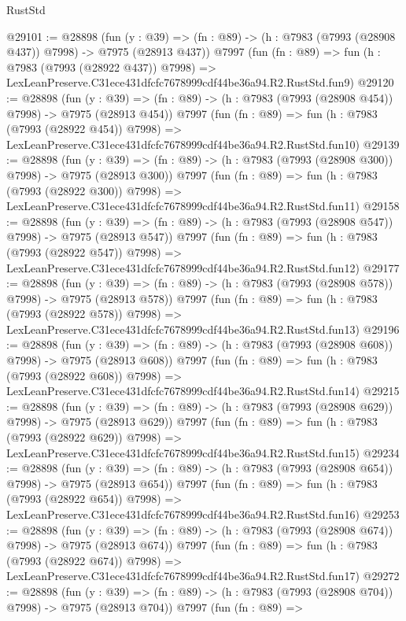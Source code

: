 \begin{lexlean}{RustStd}
\begin{coremodule}
@29101 := @28898
    (fun (y : @39) => (fn : @89) -> (h : @7983 (@7993 (@28908 @437)) @7998) -> @7975 (@28913 @437))
    @7997
    (fun (fn : @89) =>
    fun (h : @7983 (@7993 (@28922 @437)) @7998) =>
    LexLeanPreserve.C31ece431dfcfc7678999cdf44be36a94.R2.RustStd.fun9)
@29120 := @28898
    (fun (y : @39) => (fn : @89) -> (h : @7983 (@7993 (@28908 @454)) @7998) -> @7975 (@28913 @454))
    @7997
    (fun (fn : @89) =>
    fun (h : @7983 (@7993 (@28922 @454)) @7998) =>
    LexLeanPreserve.C31ece431dfcfc7678999cdf44be36a94.R2.RustStd.fun10)
@29139 := @28898
    (fun (y : @39) => (fn : @89) -> (h : @7983 (@7993 (@28908 @300)) @7998) -> @7975 (@28913 @300))
    @7997
    (fun (fn : @89) =>
    fun (h : @7983 (@7993 (@28922 @300)) @7998) =>
    LexLeanPreserve.C31ece431dfcfc7678999cdf44be36a94.R2.RustStd.fun11)
@29158 := @28898
    (fun (y : @39) => (fn : @89) -> (h : @7983 (@7993 (@28908 @547)) @7998) -> @7975 (@28913 @547))
    @7997
    (fun (fn : @89) =>
    fun (h : @7983 (@7993 (@28922 @547)) @7998) =>
    LexLeanPreserve.C31ece431dfcfc7678999cdf44be36a94.R2.RustStd.fun12)
@29177 := @28898
    (fun (y : @39) => (fn : @89) -> (h : @7983 (@7993 (@28908 @578)) @7998) -> @7975 (@28913 @578))
    @7997
    (fun (fn : @89) =>
    fun (h : @7983 (@7993 (@28922 @578)) @7998) =>
    LexLeanPreserve.C31ece431dfcfc7678999cdf44be36a94.R2.RustStd.fun13)
@29196 := @28898
    (fun (y : @39) => (fn : @89) -> (h : @7983 (@7993 (@28908 @608)) @7998) -> @7975 (@28913 @608))
    @7997
    (fun (fn : @89) =>
    fun (h : @7983 (@7993 (@28922 @608)) @7998) =>
    LexLeanPreserve.C31ece431dfcfc7678999cdf44be36a94.R2.RustStd.fun14)
@29215 := @28898
    (fun (y : @39) => (fn : @89) -> (h : @7983 (@7993 (@28908 @629)) @7998) -> @7975 (@28913 @629))
    @7997
    (fun (fn : @89) =>
    fun (h : @7983 (@7993 (@28922 @629)) @7998) =>
    LexLeanPreserve.C31ece431dfcfc7678999cdf44be36a94.R2.RustStd.fun15)
@29234 := @28898
    (fun (y : @39) => (fn : @89) -> (h : @7983 (@7993 (@28908 @654)) @7998) -> @7975 (@28913 @654))
    @7997
    (fun (fn : @89) =>
    fun (h : @7983 (@7993 (@28922 @654)) @7998) =>
    LexLeanPreserve.C31ece431dfcfc7678999cdf44be36a94.R2.RustStd.fun16)
@29253 := @28898
    (fun (y : @39) => (fn : @89) -> (h : @7983 (@7993 (@28908 @674)) @7998) -> @7975 (@28913 @674))
    @7997
    (fun (fn : @89) =>
    fun (h : @7983 (@7993 (@28922 @674)) @7998) =>
    LexLeanPreserve.C31ece431dfcfc7678999cdf44be36a94.R2.RustStd.fun17)
@29272 := @28898
    (fun (y : @39) => (fn : @89) -> (h : @7983 (@7993 (@28908 @704)) @7998) -> @7975 (@28913 @704))
    @7997
    (fun (fn : @89) =>

\end{coremodule}
\end{lexlean}
